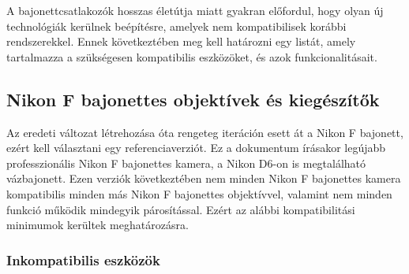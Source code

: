 \def\checkmark{\tikz\fill[scale=0.4](0,.25) -- (.25,0) -- (1,.7) -- (.25,.15) -- cycle;}

A bajonettcsatlakozók hosszas életútja miatt gyakran előfordul, hogy olyan új technológiák kerülnek beépítésre, amelyek nem kompatibilisek korábbi rendszerekkel. Ennek következtében meg kell határozni egy listát, amely tartalmazza a szükségesen kompatibilis eszközöket, és azok funkcionalitásait.

\subsection{Nikon F bajonettes objektívek és kiegészítők}

Az eredeti változat létrehozása óta rengeteg iteráción esett át a Nikon F bajonett, ezért kell választani egy referenciaverziót. Ez a dokumentum írásakor legújabb professzionális Nikon F bajonettes kamera, a Nikon D6-on is megtalálható vázbajonett. Ezen verziók következtében nem minden Nikon F bajonettes kamera kompatibilis minden más Nikon F bajonettes objektívvel, valamint nem minden funkció működik mindegyik párosítással. Ezért az alábbi kompatibilitási minimumok kerültek meghatározásra. 

\subsubsection{Inkompatibilis eszközök}

